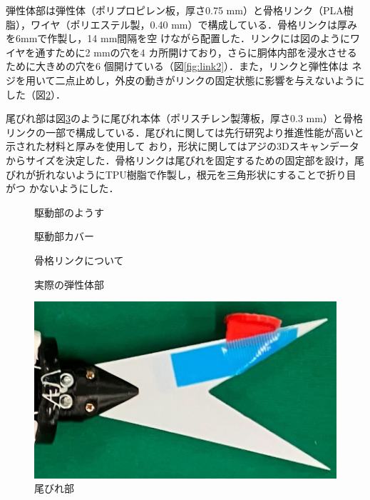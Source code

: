 弾性体部は弾性体（ポリプロピレン板，厚さ0.75 mm）と骨格リンク（PLA樹脂），ワイヤ（ポリエステル製，0.40 mm）で構成している．骨格リンクは厚みを6mmで作製し，14 mm間隔を空
けながら配置した．リンクには図のようにワイヤを通すために2 mmの穴を4 カ所開けており，さらに胴体内部を浸水させるために大きめの穴を6 個開けている（図\ref{fig:link2}）．また，リンクと弾性体は
ネジを用いて二点止めし，外皮の動きがリンクの固定状態に影響を与えないようにした（図\ref{fig:real_link}）．

尾びれ部は図\ref{fig:obire}のように尾びれ本体（ポリスチレン製薄板，厚さ0.3 mm）と骨格リンクの一部で構成している．尾びれに関しては先行研究より推進性能が高いと示された材料と厚みを使用して
おり，形状に関してはアジの3Dスキャンデータからサイズを決定した．骨格リンクは尾びれを固定するための固定部を設け，尾びれが折れないようにTPU樹脂で作製し，根元を三角形状にすることで折り目がつ
かないようにした．

\begin{figure}[t]
    \centering
    \begin{minipage}[b]{0.35\linewidth}
        \centering
        \caption{駆動部のようす}
        \label{fig:kudou}
    \end{minipage}
    \hspace{0.1\linewidth}
    \begin{minipage}[b]{0.35\linewidth}
        \centering
        \caption{駆動部カバー}
        \label{fig:cover}
    \end{minipage}
\end{figure}
\begin{figure}[t]
    \centering
    \begin{minipage}[b]{0.35\linewidth}
        \centering
        \caption{骨格リンクについて}
        \label{fig:link2}
    \end{minipage}
    \hspace{0.1\linewidth}
    \begin{minipage}[b]{0.35\linewidth}
        \centering
        \caption{実際の弾性体部}
        \label{fig:real_link}
    \end{minipage}
\end{figure}
\begin{figure}[t]
    \centering
    \includegraphics[width=0.6\linewidth]{chapters/picture/obire.jpg}
    \caption{尾びれ部}
    \label{fig:obire}
\end{figure}

